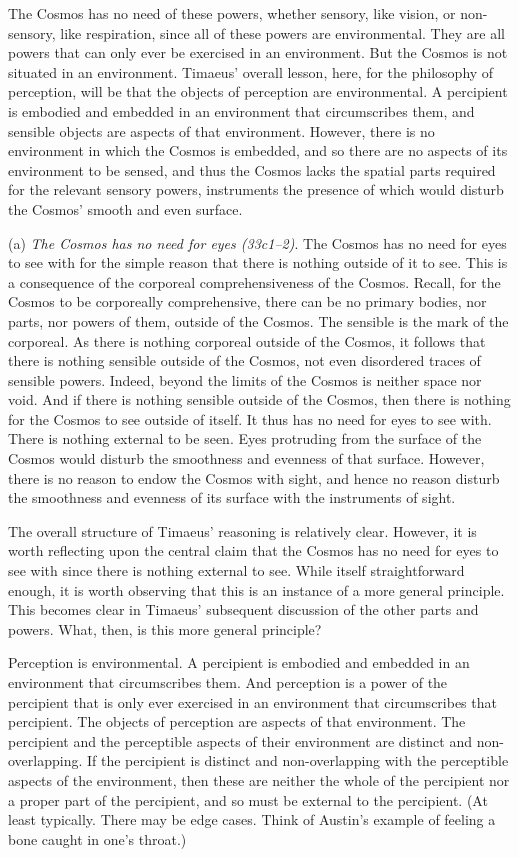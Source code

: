 The Cosmos has no need of these powers, whether sensory, like vision, or non-sensory, like respiration, since all of these powers are environmental. They are all powers that can only ever be exercised in an environment. But the Cosmos is not situated in an environment. Timaeus' overall lesson, here, for the philosophy of perception, will be that the objects of perception are environmental. A percipient is embodied and embedded in an environment that circumscribes them, and sensible objects are aspects of that environment. However, there is no environment in which the Cosmos is embedded, and so there are no aspects of its environment to be sensed, and thus the Cosmos lacks the spatial parts required for the relevant sensory powers, instruments the presence of which would disturb the Cosmos' smooth and even surface.

(a) \emph{The Cosmos has no need for eyes (33c1--2)}. The Cosmos has no need for eyes to see with for the simple reason that there is nothing outside of it to see. This is a consequence of the corporeal comprehensiveness of the Cosmos. Recall, for the Cosmos to be corporeally comprehensive, there can be no primary bodies, nor parts, nor powers of them, outside of the Cosmos. The sensible is the mark of the corporeal. As there is nothing corporeal outside of the Cosmos, it follows that there is nothing sensible outside of the Cosmos, not even disordered traces of sensible powers. Indeed, beyond the limits of the Cosmos is neither space nor void. And if there is nothing sensible outside of the Cosmos, then there is nothing for the Cosmos to see outside of itself. It thus has no need for eyes to see with. There is nothing external to be seen. Eyes protruding from the surface of the Cosmos would disturb the smoothness and evenness of that surface. However, there is no reason to endow the Cosmos with sight, and hence no reason disturb the smoothness and evenness of its surface with the instruments of sight.

The overall structure of Timaeus' reasoning is relatively clear. However, it is worth reflecting upon the central claim that the Cosmos has no need for eyes to see with since there is nothing external to see. While itself straightforward enough, it is worth observing that this is an instance of a more general principle. This becomes clear in Timaeus' subsequent discussion of the other parts and powers. What, then, is this more general principle?

Perception is environmental. A percipient is embodied and embedded in an environment that circumscribes them. And perception is a power of the percipient that is only ever exercised in an environment that circumscribes that percipient. The objects of perception are aspects of that environment. The percipient and the perceptible aspects of their environment are distinct and non-overlapping. If the percipient is distinct and non-overlapping with the perceptible aspects of the environment, then these are neither the whole of the percipient nor a proper part of the percipient, and so must be external to the percipient. (At least typically. There may be edge cases. Think of Austin's example of feeling a bone caught in one's throat.)

